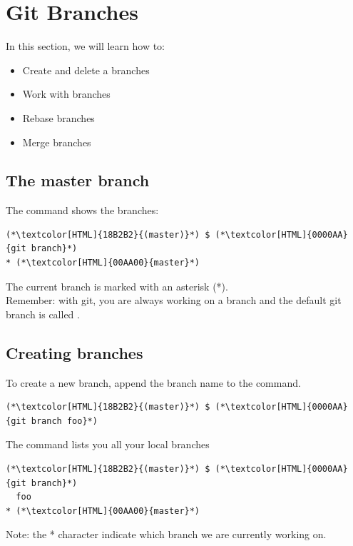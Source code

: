 \section{Git Branches}
\begin{frame}[fragile]
  \slidetitle

  In this section, we will learn how to:
  \begin{itemize}
    \item Create and delete a branches
    \item Work with branches
    \item Rebase branches
    \item Merge branches
  \end{itemize}
\end{frame}

\subsection{The master branch}
\begin{frame}[fragile]
  \subslidetitle

  The command  shows the branches:
  \begin{lstlisting}
(*\textcolor[HTML]{18B2B2}{(master)}*) $ (*\textcolor[HTML]{0000AA}{git branch}*)
* (*\textcolor[HTML]{00AA00}{master}*)
\end{lstlisting}

  The current branch is marked with an asterisk (*).
  \\
  \vspace{1em}
  Remember: with git, you are always working on a branch and the default git branch is called .

\end{frame}

\subsection{Creating branches}
\begin{frame}[fragile]
  \subslidetitle

  To create a new  branch, append the branch name to the  command.
  \begin{lstlisting}
(*\textcolor[HTML]{18B2B2}{(master)}*) $ (*\textcolor[HTML]{0000AA}{git branch foo}*)
\end{lstlisting}

  The  command lists you all your local branches
  \begin{lstlisting}
(*\textcolor[HTML]{18B2B2}{(master)}*) $ (*\textcolor[HTML]{0000AA}{git branch}*)
  foo
* (*\textcolor[HTML]{00AA00}{master}*)
\end{lstlisting}

Note: the * character indicate which branch we are currently working on.
\end{frame}

